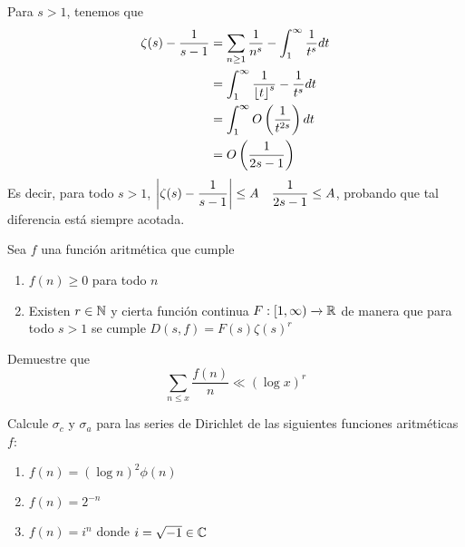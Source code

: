 \begin{sol}
    Para $s>1$, tenemos que
    \begin{align*}
        \zeta(s) - \dfrac{1}{s-1} &= \sum_{n \geq 1} \dfrac{1}{n^s} - \int_1^\infty \dfrac{1}{t^s} dt\\
        &= \int_1^\infty \dfrac{1}{\left\lfloor t\right\rfloor^s} - \dfrac{1}{t^s} dt\\
        &= \int_1^\infty O\left(\dfrac{1}{t^{2s}}\right) dt\\
        &= O\left(\dfrac{1}{2s-1}\right)
    \end{align*}
    Es decir, para todo $s>1$, $\left|\zeta(s) - \dfrac{1}{s-1}\right| \leq A\quad\dfrac{1}{2s-1} \leq A$, probando que tal diferencia está siempre acotada.
\end{sol}
\begin{prob}[2 pts.]
    Sea $f$ una función aritmética que cumple
    \begin{enumerate}[label = (\roman*)]
        \item  $f(n)\geq 0$ para todo $n$

        \item Existen $r\in\mathbb{N}$ y cierta función continua $F:[1,\infty)\xrightarrow[]{}\mathbb{R}$ de manera que para todo $s>1$ se cumple $D(s,f)=F(s)\zeta(s)^r$
    \end{enumerate}
    Demuestre que
    \[\sum_{n\leq x}\frac{f(n)}{n}\ll(\log x)^r\]
\end{prob}

\begin{sol}
    
\end{sol}

\begin{prob}[2 pts. c/u]
    Calcule $\sigma_c$ y $\sigma_a$ para las series de Dirichlet de las siguientes funciones aritméticas $f$:
    \begin{enumerate}[label = (\roman*)]
        \item $f(n)=(\log n)^2\phi(n)$

        \item $f(n)=2^{-n}$

        \item $f(n)=i^n$ donde $i=\sqrt{-1}\in\mathbb{C}$
    \end{enumerate}
\end{prob}

